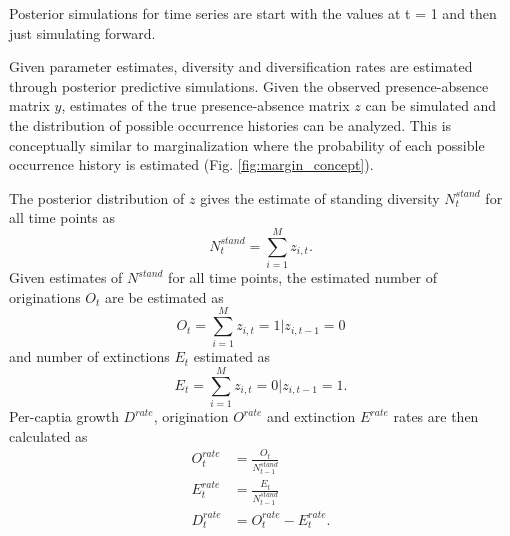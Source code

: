\documentclass[12pt,letterpaper]{article}
\begin{document}
Posterior simulations for time series are start with the values at t = 1 and then just simulating forward. 


Given parameter estimates, diversity and diversification rates are estimated through posterior predictive simulations. Given the observed presence-absence matrix \(y\), estimates of the true presence-absence matrix \(z\) can be simulated and the distribution of possible occurrence histories can be analyzed. This is conceptually similar to marginalization where the probability of each possible occurrence history is estimated (Fig. \ref{fig:margin_concept}). 

The posterior distribution of \(z\) gives the estimate of standing diversity \(N^{stand}_{t}\) for all time points as 
\begin{equation}
  N^{stand}_{t} = \sum_{i = 1}^{M} z_{i, t}.
  \label{eq:stand_est}
\end{equation}
Given estimates of \(N^{stand}\) for all time points, the estimated number of originations \(O_{t}\) are be estimated as 
\begin{equation}
  O_t = \sum_{i = 1}^{M} z_{i, t} = 1 | z_{i, t - 1} = 0
  \label{eq:orig_est}
\end{equation}
and number of extinctions \(E_{t}\) estimated as
\begin{equation}
  E_{t} = \sum_{i = 1}^{M} z_{i, t} = 0 | z_{i, t - 1} = 1.
  \label{eq:death_est}
\end{equation}
Per-captia growth \(D^{rate}\), origination \(O^{rate}\) and extinction \(E^{rate}\) rates are then calculated as
\begin{equation}
  \begin{aligned}
    O^{rate}_{t} &= \frac{O_t}{N^{stand}_{t - 1}} \\
    E^{rate}_{t} &= \frac{E_t}{N^{stand}_{t - 1}} \\
    D^{rate}_{t} &= O^{rate}_{t} - E^{rate}_{t}. \\
  \end{aligned}
  \label{eq:per_capita_est}
\end{equation}

\end{document}

